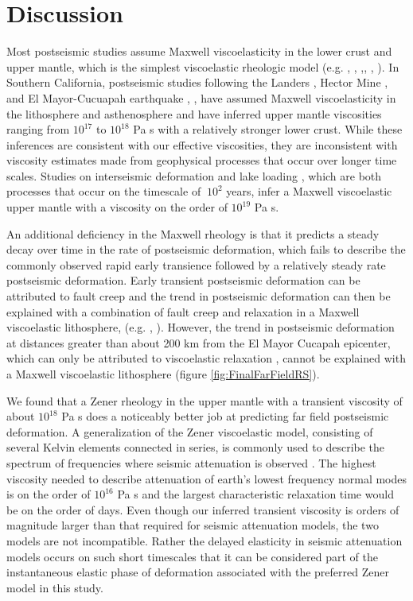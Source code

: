 \documentclass[12pt]{article}
\begin{document}
\section{Discussion}

Most postseismic studies assume Maxwell viscoelasticity in the lower crust and upper mantle, which is the simplest viscoelastic rheologic model (e.g. \cite{Nur1974}, \cite{Pollitz2000}, \cite{Hetland2003},\cite{Freed2006a}, \cite{Johnson2009}, \cite{Hearn2009}).  In Southern California, postseismic studies following the Landers \cite{Pollitz2000}, Hector Mine \cite{Pollitz2001}, and El Mayor-Cucuapah earthquake \cite{Spinler2015}, \cite{Rollins2015}, have assumed Maxwell viscoelasticity in the lithosphere and asthenosphere and have inferred upper mantle viscosities ranging from $10^{17}$ to $10^{18}$ Pa s with a relatively stronger lower crust. While these inferences are consistent with our effective viscosities, they are inconsistent with viscosity estimates made from geophysical processes that occur over longer time scales. Studies on interseismic deformation \cite{Lundgren2009} and lake loading \cite{Luttrell2007}, which are both processes that occur on the timescale of $~10^2$ years, infer a Maxwell viscoelastic upper mantle with a viscosity on the order of $10^{19}$ Pa s. 

An additional deficiency in the Maxwell rheology is that it predicts a steady decay over time in the rate of postseismic deformation, which fails to describe the commonly observed rapid early transience followed by a relatively steady rate postseismic deformation.  Early transient postseismic deformation can be attributed to fault creep \cite{Savage2005a} and the trend in postseismic deformation can then be explained with a combination of fault creep and relaxation in a Maxwell viscoelastic lithosphere, (e.g. \cite{Hearn2009}, \cite{Johnson2009}). However, the trend in postseismic deformation at distances greater than about 200 km from the El Mayor Cucapah epicenter, which can only be attributed to viscoelastic relaxation \cite{Freed2007a}, cannot be explained with a Maxwell viscoelastic lithosphere (figure \ref{fig:FinalFarFieldRS}). 

We found that a Zener rheology in the upper mantle with a transient viscosity of about $10^{18}$ Pa s does a noticeably better job at predicting far field postseismic deformation.  A generalization of the Zener viscoelastic model, consisting of several Kelvin elements connected in series, is commonly used to describe the spectrum of frequencies where seismic attenuation is observed \cite{Liu1976}.  The highest viscosity needed to describe attenuation of earth's lowest frequency normal modes is on the order of $10^{16}$ Pa s \cite{Yuen1982} and the largest characteristic relaxation time would be on the order of days. Even though our inferred transient viscosity is orders of magnitude larger than that required for seismic attenuation models, the two models are not incompatible.  Rather the delayed elasticity in seismic attenuation models occurs on such short timescales that it can be considered  part of the instantaneous elastic phase of deformation associated with the preferred Zener model in this study. 
\end{document}
